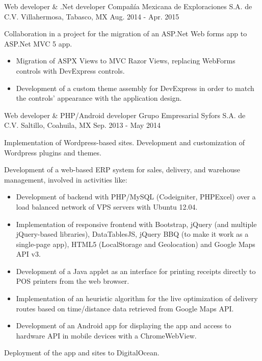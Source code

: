 \begin{cventries}

\cventry
{Web developer \& .Net developer} %
{Compañía Mexicana de Exploraciones S.A. de C.V.} %
{Villahermosa, Tabasco, MX} %
{Aug. 2014 - Apr. 2015} %
{ %
	\begin{cvitems}
		\item {Collaboration in a project for the migration of an ASP.Net Web forms app to ASP.Net MVC 5 app.}
		\begin{itemize}
			\item {Migration of ASPX Views to MVC Razor Views, replacing WebForms controls with DevExpress controls.}
			\item {Development of a custom theme assembly for DevExpress in order to match the controls' appearance with the application design.}
		\end{itemize}
	\end{cvitems}
}


\cventry
{Web developer \& PHP/Android developer} %
{Grupo Empresarial Syfors S.A. de C.V.} %
{Saltillo, Coahuila, MX} %
{Sep. 2013 - May 2014} %
{ %
	\begin{cvitems}
		\item {Implementation of Wordpress-based sites. Development and customization of Wordpress plugins and themes.}
		\item {Development of a web-based ERP system for sales, delivery, and warehouse management, involved in activities like:}
		\begin{itemize}
			\item {Development of backend with PHP/MySQL (Codeigniter, PHPExcel) over a load balanced network of VPS servers with Ubuntu 12.04.}
			\item {Implementation of responsive frontend with Bootstrap, jQuery (and multiple jQuery-based libraries), DataTablesJS, jQuery BBQ (to make it work as a single-page app), HTML5 (LocalStorage and Geolocation) and Google Maps API v3.}
			\item {Development of a Java applet as an interface for printing receipts directly to POS printers from the web browser.}
			\item {Implementation of an heuristic algorithm for the live optimization of delivery routes based on time/distance data retrieved from Google Maps API.}
			\item {Development of an Android app for displaying the app and access to hardware API in mobile devices with a ChromeWebView.}
		\end{itemize}
		\item {Deployment of the app and sites to DigitalOcean.}
	\end{cvitems} 
}


\end{cventries}
